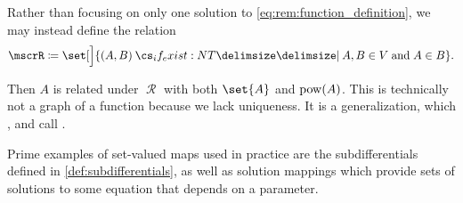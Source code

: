 \begin{remark}
  Rather than focusing on only one solution to \eqref{eq:rem:function_definition}, we may instead define the relation
  \begin{equation*}
    \mscrR \coloneqq \set[\Big]{ (A, B) \given* A, B \in V \T{and} A \in B }.
  \end{equation*}

  Then \( A \) is related under \( \mscrR \) with both \( \set{ A } \) and \( \operatorname{pow}(A) \). This is technically not a graph of a function because we lack uniqueness. It is a generalization, which ,  and  call .

  Prime examples of set-valued maps used in practice are the subdifferentials defined in \cref{def:subdifferentials}, as well as solution mappings which provide sets of solutions to some equation that depends on a parameter.
\end{remark}

